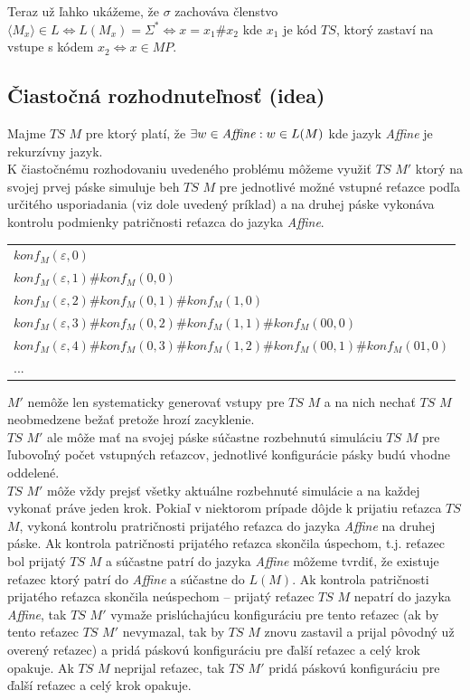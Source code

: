 \documentclass[11pt,a4paper]{article}
\begin{document}
Teraz už ľahko ukážeme, že $\sigma$ zachováva členstvo $\langle M_{x} \rangle \in L \Leftrightarrow L(M_x) = \Sigma^{*} \Leftrightarrow x=x_1\#x_2$ kde $x_1$ je kód $TS$, ktorý zastaví na vstupe s kódem $x_2 \Leftrightarrow x \in MP$.

\newpage
\subsection{Čiastočná rozhodnuteľnosť (idea)}

Majme $TS$ $M$ pre ktorý platí, že $\exists w \in \text{\textit{Affine}}: w \in L(M)$ kde jazyk \textit{Affine} je rekurzívny jazyk.\\

K čiastočnému rozhodovaniu uvedeného problému môžeme využiť $TS$ $M'$ ktorý na svojej prvej páske simuluje beh $TS$ $M$ pre jednotlivé možné vstupné reťazce podľa určitého usporiadania (viz dole uvedený príklad) a na druhej páske vykonáva kontrolu podmienky patričnosti reťazca do jazyka \textit{Affine}.

\begin{center}
    \begin{tabular}{l}
        $konf_M(\varepsilon,0)$\\
        $konf_M(\varepsilon,1)\#konf_M(0,0)$\\
        $konf_M(\varepsilon,2)\#konf_M(0,1)\#konf_M(1,0)$\\
        $konf_M(\varepsilon,3)\#konf_M(0,2)\#konf_M(1,1)\#konf_M(00,0)$\\
        $konf_M(\varepsilon,4)\#konf_M(0,3)\#konf_M(1,2)\#konf_M(00,1)\#konf_M(01,0)$\\
        ...
    \end{tabular}
\end{center}

$M'$ nemôže len systematicky generovať vstupy pre $TS$ $M$ a na nich nechať $TS$ $M$ neobmedzene bežať pretože hrozí zacyklenie.\\

$TS$ $M'$ ale môže mať na svojej páske súčastne rozbehnutú simuláciu $TS$ $M$ pre ľubovoľný počet vstupných reťazcov, jednotlivé konfigurácie pásky budú vhodne oddelené.\\

$TS$ $M'$ môže vždy prejsť všetky aktuálne rozbehnuté simulácie a na každej vykonať práve jeden krok. Pokiaľ v niektorom prípade dôjde k prijatiu reťazca $TS$ $M$, vykoná kontrolu pratričnosti prijatého reťazca do jazyka \textit{Affine} na druhej páske. Ak kontrola patričnosti prijatého reťazca skončila úspechom, t.j. reťazec bol prijatý $TS$ $M$ a súčastne patrí do jazyka \textit{Affine} môžeme tvrdiť, že existuje reťazec ktorý patrí do \textit{Affine} a súčastne do $L(M)$. Ak kontrola patričnosti prijatého reťazca skončila neúspechom -- prijatý reťazec $TS$ $M$ nepatrí do jazyka \textit{Affine}, tak $TS$ $M'$ vymaže prislúchajúcu konfiguráciu pre tento reťazec (ak by tento reťazec $TS$ $M'$ nevymazal, tak by $TS$ $M$ znovu zastavil a prijal pôvodný už overený reťazec) a pridá páskovú konfiguráciu pre ďalší reťazec a celý krok opakuje. Ak $TS$ $M$ neprijal reťazec, tak $TS$ $M'$ pridá páskovú konfiguráciu pre ďalší reťazec a celý krok opakuje.\\
\end{document}
